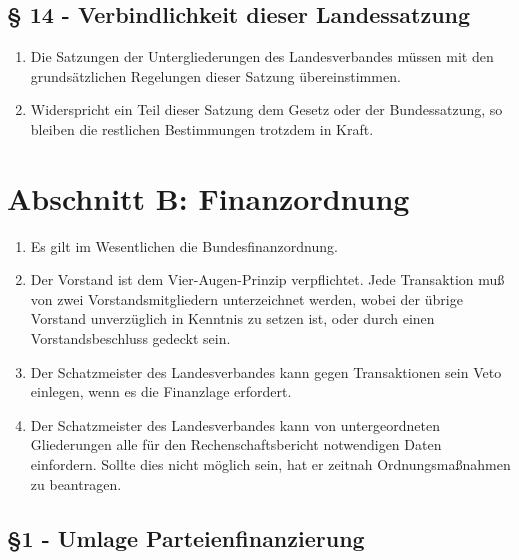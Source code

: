 \subsection{§ 14 - Verbindlichkeit dieser Landessatzung}
\begin{enumerate}
\item Die Satzungen der Untergliederungen des Landesverbandes müssen mit den
grundsätzlichen Regelungen dieser Satzung übereinstimmen.

\item Widerspricht ein Teil dieser Satzung dem Gesetz oder der Bundessatzung, so
bleiben die restlichen Bestimmungen trotzdem in Kraft.
\end{enumerate}


\section{Abschnitt B: Finanzordnung}
\begin{enumerate}
\item Es gilt im Wesentlichen die Bundesfinanzordnung.

\item Der Vorstand ist dem Vier-Augen-Prinzip verpflichtet. Jede Transaktion muß
von zwei Vorstandsmitgliedern unterzeichnet werden, wobei der übrige Vorstand
unverzüglich in Kenntnis zu setzen ist, oder durch einen Vorstandsbeschluss
gedeckt sein.

\item Der Schatzmeister des Landesverbandes kann gegen Transaktionen sein Veto
einlegen, wenn es die Finanzlage erfordert.

\item Der Schatzmeister des Landesverbandes kann von untergeordneten
Gliederungen alle für den Rechenschaftsbericht notwendigen Daten einfordern.
Sollte dies nicht möglich sein, hat er zeitnah Ordnungsmaßnahmen zu beantragen.
\end{enumerate}

\subsection{§1 - Umlage Parteienfinanzierung }

